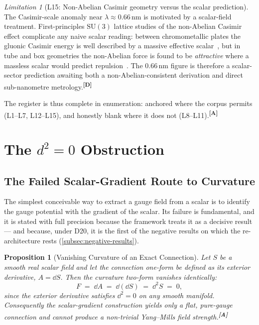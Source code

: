 \documentclass[12pt,a4paper,twoside]{article}
\theoremstyle{plain}
\newtheorem{proposition}[theorem]{Proposition}
\theoremstyle{definition}
\theoremstyle{remark}
\newtheorem{limitation}[theorem]{Limitation}
\newcommand{\catmark}[1]{\textsuperscript{\textsf{\textbf{[#1]}}}}
\begin{document}
\begin{limitation}[L15: Non-Abelian Casimir geometry versus the scalar prediction]
\label{lim:L15}
The Casimir-scale anomaly near $\lambda \approx 0.66\,\mathrm{nm}$ is
motivated by a scalar-field treatment. First-principles $\mathrm{SU}(3)$
lattice studies of the non-Abelian Casimir effect complicate any naive
scalar reading: between chromometallic plates the gluonic Casimir energy
is well described by a massive effective scalar~\cite{chernodub2023}, but in tube and box
geometries the non-Abelian force is found to be \emph{attractive} where
a massless scalar would predict repulsion~\cite{ngwenya2025}. The $0.66\,\mathrm{nm}$
figure is therefore a scalar-sector prediction awaiting both a
non-Abelian-consistent derivation and direct sub-nanometre metrology.\catmark{D}
\end{limitation}

\noindent The register is thus complete in enumeration: anchored where
the corpus permits (L1--L7, L12--L15), and honestly blank where it does
not (L8--L11).\catmark{A}

\section{The \texorpdfstring{$d^2 = 0$}{d2=0} Obstruction}
\label{sec:d2-obstruction}

\subsection{The Failed Scalar-Gradient Route to Curvature}
\label{subsec:failed-scalar-gradient}

The simplest conceivable way to extract a gauge field from a scalar is
to identify the gauge potential with the gradient of the scalar. Its
failure is fundamental, and it is stated with full precision because the
framework treats it as a decisive result --- and because, under D20, it
is the first of the negative results on which the re-architecture
rests (\cref{subsec:negative-results}).

\begin{proposition}[Vanishing Curvature of an Exact Connection]
\label{prop:d2-obstruction}
Let $S$ be a smooth real scalar field and let the connection one-form be
defined as its exterior derivative, $A = \dd S$. Then the curvature
two-form vanishes identically:
\[
 F \;=\; \dd A \;=\; \dd(\dd S) \;=\; \dd^2 S \;=\; 0,
\]
since the exterior derivative satisfies $\dd^2 = 0$ on any smooth
manifold. Consequently the scalar-gradient construction yields only a
flat, pure-gauge connection and cannot produce a non-trivial Yang--Mills
field strength.\catmark{A}
\end{proposition}
\end{document}
